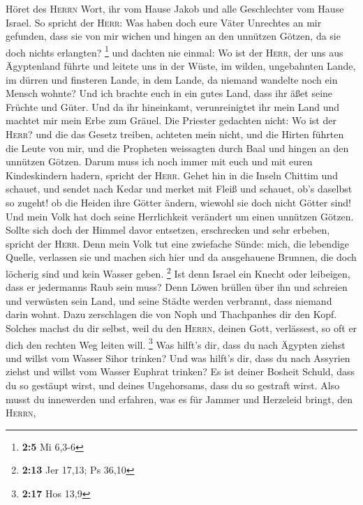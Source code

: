  Höret des \textsc{Herrn} Wort, ihr vom Hause Jakob und
alle Geschlechter vom Hause Israel.  So spricht der
\textsc{Herr}: Was haben doch eure Väter Unrechtes an mir gefunden, dass
sie von mir wichen und hingen an den unnützen Götzen, da sie doch nichts
erlangten? \footnote{\textbf{2:5} Mi 6,3-6}  und dachten
nie einmal: Wo ist der \textsc{Herr}, der uns aus Ägyptenland führte und
leitete uns in der Wüste, im wilden, ungebahnten Lande, im dürren und
finsteren Lande, in dem Lande, da niemand wandelte noch ein Mensch
wohnte?  Und ich brachte euch in ein gutes Land, dass ihr
äßet seine Früchte und Güter. Und da ihr hineinkamt, verunreinigtet ihr
mein Land und machtet mir mein Erbe zum Gräuel.  Die
Priester gedachten nicht: Wo ist der \textsc{Herr}? und die das Gesetz
treiben, achteten mein nicht, und die Hirten führten die Leute von mir,
und die Propheten weissagten durch Baal und hingen an den unnützen
Götzen.  Darum muss ich noch immer mit euch und mit euren
Kindeskindern hadern, spricht der \textsc{Herr}.  Gehet
hin in die Inseln Chittim und schauet, und sendet nach Kedar und merket
mit Fleiß und schauet, ob's daselbst so zugeht!  ob die
Heiden ihre Götter ändern, wiewohl sie doch nicht Götter sind! Und mein
Volk hat doch seine Herrlichkeit verändert um einen unnützen Götzen.
 Sollte sich doch der Himmel davor entsetzen, erschrecken
und sehr erbeben, spricht der \textsc{Herr}.  Denn mein
Volk tut eine zwiefache Sünde: mich, die lebendige Quelle, verlassen sie
und machen sich hier und da ausgehauene Brunnen, die doch löcherig sind
und kein Wasser geben. \footnote{\textbf{2:13} Jer 17,13; Ps 36,10}
 Ist denn Israel ein Knecht oder leibeigen, dass er
jedermanns Raub sein muss?  Denn Löwen brüllen über ihn
und schreien und verwüsten sein Land, und seine Städte werden verbrannt,
dass niemand darin wohnt.  Dazu zerschlagen die von Noph
und Thachpanhes dir den Kopf.  Solches machst du dir
selbst, weil du den \textsc{Herrn}, deinen Gott, verlässest, so oft er
dich den rechten Weg leiten will. \footnote{\textbf{2:17} Hos 13,9}
 Was hilft's dir, dass du nach Ägypten ziehst und willst
vom Wasser Sihor trinken? Und was hilft's dir, dass du nach Assyrien
ziehst und willst vom Wasser Euphrat trinken?  Es ist
deiner Bosheit Schuld, dass du so gestäupt wirst, und deines
Ungehorsams, dass du so gestraft wirst. Also musst du innewerden und
erfahren, was es für Jammer und Herzeleid bringt, den \textsc{Herrn},
